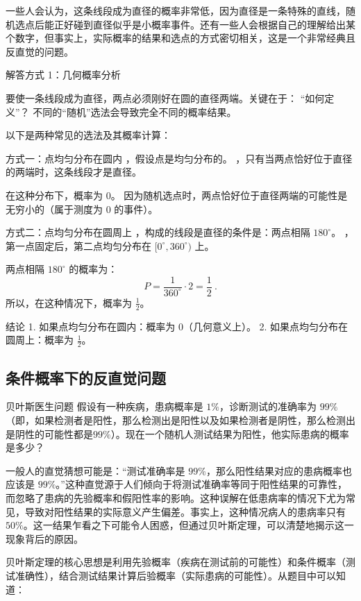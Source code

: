 一些人会认为，这条线段成为直径的概率非常低，因为直径是一条特殊的直线，随机选点后能正好碰到直径似乎是小概率事件。还有一些人会根据自己的理解给出某个数字，但事实上，实际概率的结果和选点的方式密切相关，这是一个非常经典且反直觉的问题。

解答方式 1：几何概率分析

要使一条线段成为直径，两点必须刚好在圆的直径两端。关键在于：
“如何定义”？
不同的“随机”选法会导致完全不同的概率结果。

以下是两种常见的选法及其概率计算：

方式一：点均匀分布在圆内
，假设点是均匀分布的。
，只有当两点恰好位于直径的两端时，这条线段才是直径。

在这种分布下，概率为 0。
因为随机选点时，两点恰好位于直径两端的可能性是无穷小的（属于测度为 0 的事件）。

方式二：点均匀分布在圆周上
，构成的线段是直径的条件是：两点相隔 $180^\circ$。
，第一点固定后，第二点均匀分布在 $[0^\circ, 360^\circ)$ 上。

两点相隔 $180^\circ$ 的概率为：
$$
P = \frac{1}{360^\circ} \cdot 2 = \frac{1}{2}~.
$$
所以，在这种情况下，概率为 $\frac{1}{2}$。

结论
	1.	如果点均匀分布在圆内：概率为 $0$（几何意义上）。
	2.	如果点均匀分布在圆周上：概率为 $\frac{1}{2}$。


\subsection{条件概率下的反直觉问题}

\begin{example}{贝叶斯医生问题}
假设有一种疾病，患病概率是 $1\%$，诊断测试的准确率为 $99\%$（即，如果检测者是阳性，那么检测出是阳性以及如果检测者是阴性，那么检测出是阴性的可能性都是$99\%$）。现在一个随机人测试结果为阳性，他实际患病的概率是多少？
\end{example}

一般人的直觉猜想可能是：“测试准确率是 $99\%$，那么阳性结果对应的患病概率也应该是 $99\%$。”这种直觉源于人们倾向于将测试准确率等同于阳性结果的可靠性，而忽略了患病的先验概率和假阳性率的影响。这种误解在低患病率的情况下尤为常见，导致对阳性结果的实际意义产生偏差。事实上，这种情况病人的患病率只有$50\%$。这一结果乍看之下可能令人困惑，但通过贝叶斯定理，可以清楚地揭示这一现象背后的原因。

贝叶斯定理的核心思想是利用先验概率（疾病在测试前的可能性）和条件概率（测试准确性），结合测试结果计算后验概率（实际患病的可能性）。从题目中可以知道：

